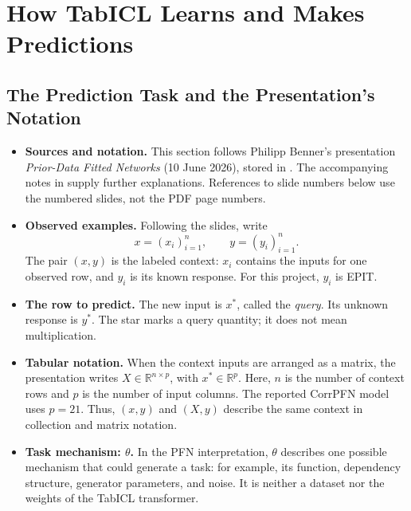 \documentclass[11pt]{article}
\newenvironment{notes}
  {\begin{itemize}\setlength{\itemsep}{0.45em}\setlength{\parsep}{0pt}}
  {\end{itemize}}
\begin{document}
\section{How TabICL Learns and Makes Predictions}
\label{sec:tabicl}

\subsection{The Prediction Task and the Presentation's Notation}
\label{sec:pfn-notation}

\begin{notes}
    \item \textbf{Sources and notation.} This section follows Philipp
    Benner's presentation \textit{Prior-Data Fitted Networks}
    (10 June 2026), stored in
    . The accompanying notes in
     supply further explanations.
    References to slide numbers below use the numbered slides, not
    the PDF page numbers.

    \item \textbf{Observed examples.} Following the slides, write
    \[
        x=(x_i)_{i=1}^{n},
        \qquad
        y=(y_i)_{i=1}^{n}.
    \]
    The pair \((x,y)\) is the labeled context: \(x_i\) contains the
    inputs for one observed row, and \(y_i\) is its known response.
    For this project, \(y_i\) is EPIT.

    \item \textbf{The row to predict.} The new input is \(x^\ast\),
    called the \emph{query}. Its unknown response is \(y^\ast\).
    The star marks a query quantity; it does not mean multiplication.

    \item \textbf{Tabular notation.} When the context inputs are
    arranged as a matrix, the presentation writes
    \(X\in\mathbb{R}^{n\times p}\), with
    \(x^\ast\in\mathbb{R}^{p}\). Here, \(n\) is the number of context
    rows and \(p\) is the number of input columns. The reported
    CorrPFN model uses \(p=21\). Thus, \((x,y)\) and \((X,y)\)
    describe the same context in collection and matrix notation.

    \item \textbf{Task mechanism: \(\theta\).} In the PFN
    interpretation, \(\theta\) describes one possible mechanism
    that could generate a task: for example, its function, dependency
    structure, generator parameters, and noise. It is neither a
    dataset nor the weights of the TabICL transformer.


\end{notes}
\end{document}
